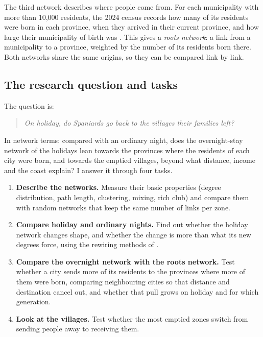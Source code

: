 The third network describes where people come from. For each municipality with more than 10,000 residents, the 2024 census records how many of its residents were born in each province, when they arrived in their current province, and how large their municipality of birth was \citep{ine2025censo}. This gives a \emph{roots network}: a link from a municipality to a province, weighted by the number of its residents born there. Both networks share the same origins, so they can be compared link by link.

\subsection{The research question and tasks}

The question is:

\begin{quote}
\emph{On holiday, do Spaniards go back to the villages their families left?}
\end{quote}

In network terms: compared with an ordinary night, does the overnight-stay network of the holidays lean towards the provinces where the residents of each city were born, and towards the emptied villages, beyond what distance, income and the coast explain? I answer it through four tasks.

\begin{enumerate}[label=\textbf{T\arabic*.}]
\item \textbf{Describe the networks.} Measure their basic properties (degree distribution, path length, clustering, mixing, rich club) and compare them with random networks that keep the same number of links per zone.
\item \textbf{Compare holiday and ordinary nights.} Find out whether the holiday network changes shape, and whether the change is more than what its new degrees force, using the rewiring methods of \citet{zhou2007structural}.
\item \textbf{Compare the overnight network with the roots network.} Test whether a city sends more of its residents to the provinces where more of them were born, comparing neighbouring cities so that distance and destination cancel out, and whether that pull grows on holiday and for which generation.
\item \textbf{Look at the villages.} Test whether the most emptied zones switch from sending people away to receiving them.
\end{enumerate}

